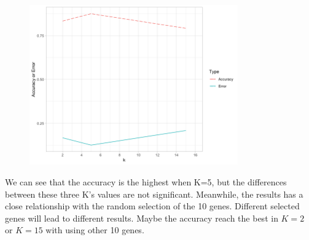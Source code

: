 \documentclass[14pt]{elegantbook}
\begin{document}
\begin{figure}[H]
    \centering
    \includegraphics[width=0.8\textwidth]{HW1_3.png}
\end{figure}

We can see that the accuracy is the highest when K=5, but the differences between these three K's values are not significant. Meanwhile, the results has a close relationship with the random selection of the 10 genes. Different selected genes will lead to different results. Maybe the accuracy reach the best in $K=2$ or $K=15$ with using other 10 genes.
\end{document}
